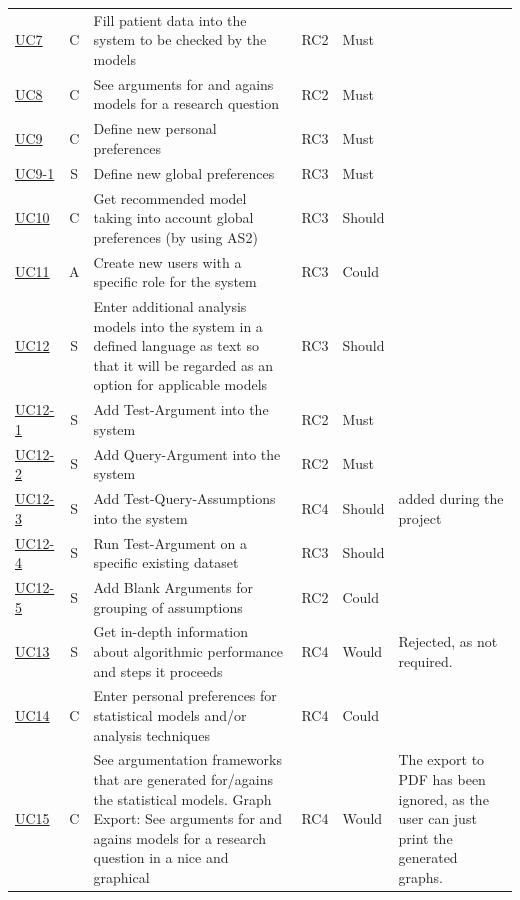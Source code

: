 \begin{landscape}
\begin{longtable}{ l c p{8cm} l l p{3cm} }
		\href{https://trello.com/c/DidVQKAS}{UC7}   &   C & 	Fill patient data into the system to be checked by the models & RC2 & Must &  \\
		\href{https://trello.com/c/be2088JH}{UC8}	& 	C & 	See arguments for and agains models for a research question & RC2 & Must &   \\
		\href{https://trello.com/c/Ca9mA3uA}{UC9}   &   C & 	Define new personal preferences & RC3 & Must &   \\
		\href{https://trello.com/c/Ca9mA3uA}{UC9-1}   &   S & 	Define new global preferences & RC3 & Must &   \\
		\href{https://trello.com/c/1s656fA9}{UC10}  &   C & 	Get recommended model taking into account global preferences (by using AS2) & RC3 & Should & 	 \\
		\href{https://trello.com/c/xUDStSOK}{UC11}  &   A & 	Create new users with a specific role for the system & RC3 & Could &    \\
		\href{https://trello.com/c/5UMo7o6U}{UC12}  &   S & 	Enter additional analysis models into the system in a defined language as text so that it will be regarded as an option for applicable models	& RC3 & Should & \\
		\href{https://trello.com/c/2V6Cl65u}{UC12-1}&   S & 	Add Test-Argument into the system & RC2 & Must & \\
		\href{https://trello.com/c/OwM2Z7wt}{UC12-2}&   S & 	Add Query-Argument into the system & RC2 & Must &  \\
		\href{https://trello.com/c/VThxB5aS}{UC12-3}&   S & 	Add Test-Query-Assumptions into the system & RC4 & Should & added during the project\\
		\href{https://trello.com/c/CkpJUNPW}{UC12-4}&   S & 	Run Test-Argument on a specific existing dataset & RC3	& Should &  \\
		\href{https://trello.com/c/Rg6GPnNE}{UC12-5}&   S & 	Add Blank Arguments for grouping of assumptions & RC2 & Could & \\
		\href{https://trello.com/c/ORlMByiQ}{UC13}  &   S & 	Get in-depth information about algorithmic performance and steps it proceeds & RC4 & Would & Rejected, as not required.\\
		\href{https://trello.com/c/NcV3lo4w}{UC14}  &   C & 	Enter personal preferences for statistical models and/or analysis techniques & RC4 & Could &   \\
		\href{https://trello.com/c/BOUu2hKN}{UC15}  &   C & 	See argumentation frameworks that are generated for/agains the statistical models. Graph Export: See arguments for and agains models for a research question in a nice and graphical &RC4 & Would & 	 The export to PDF has been ignored, as the user can just print the generated graphs.  \\

\end{longtable}
\end{landscape}
